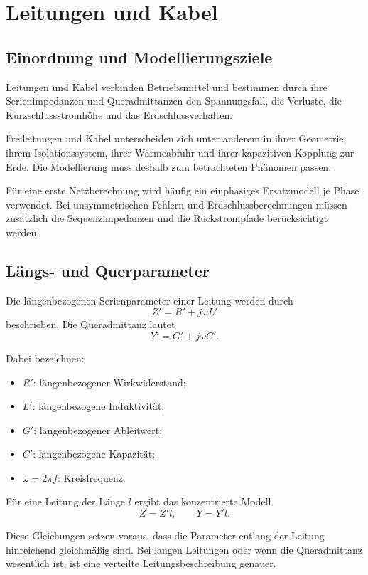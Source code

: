 \chapter{Leitungen und Kabel}
\label{chap:05-leitungen-und-kabel}

\section{Einordnung und Modellierungsziele}

Leitungen und Kabel verbinden Betriebsmittel und bestimmen durch ihre
Serienimpedanzen und Queradmittanzen den Spannungsfall, die Verluste,
die Kurzschlussstromhöhe und das Erdschlussverhalten.

Freileitungen und Kabel unterscheiden sich unter anderem in ihrer Geometrie,
ihrem Isolationssystem, ihrer Wärmeabfuhr und ihrer kapazitiven Kopplung
zur Erde. Die Modellierung muss deshalb zum betrachteten Phänomen passen.

Für eine erste Netzberechnung wird häufig ein einphasiges Ersatzmodell
je Phase verwendet. Bei unsymmetrischen Fehlern und Erdschlussberechnungen
müssen zusätzlich die Sequenzimpedanzen und die Rückstrompfade berücksichtigt werden.

\section{Längs- und Querparameter}

Die längenbezogenen Serienparameter einer Leitung werden durch
\[
  Z'=R'+j\omega L'
\]
beschrieben. Die Queradmittanz lautet
\[
  Y'=G'+j\omega C'.
\]

Dabei bezeichnen:
\begin{itemize}
  \item \(R'\): längenbezogener Wirkwiderstand;
  \item \(L'\): längenbezogene Induktivität;
  \item \(G'\): längenbezogener Ableitwert;
  \item \(C'\): längenbezogene Kapazität;
  \item \(\omega=2\pi f\): Kreisfrequenz.
\end{itemize}

Für eine Leitung der Länge \(l\) ergibt das konzentrierte Modell
\[
  Z=Z'l,\qquad Y=Y'l.
\]

Diese Gleichungen setzen voraus, dass die Parameter entlang der Leitung
hinreichend gleichmäßig sind. Bei langen Leitungen oder wenn die Queradmittanz
wesentlich ist, ist eine verteilte Leitungsbeschreibung genauer.

